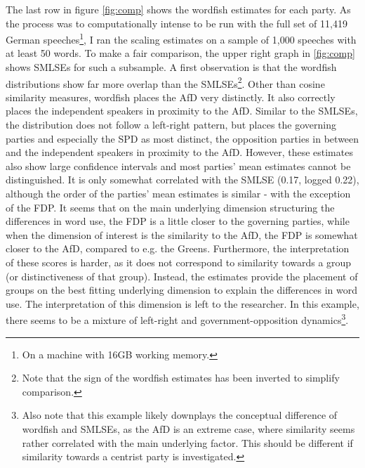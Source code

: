 \documentclass{article}
\begin{document}
The last row in figure \ref{fig:comp} shows the wordfish estimates for each party. As the process was to computationally intense to be run with the full set of 11,419 German speeches\footnote{On a machine with 16GB working memory.}, I ran the scaling estimates on a sample of 1,000 speeches with at least 50 words. To make a fair comparison, the upper right graph in \ref{fig:comp} shows SMLSEs for such a subsample. A first observation is that the wordfish distributions show far more overlap than the SMLSEs\footnote{Note that the sign of the wordfish estimates has been inverted to simplify comparison.}. Other than cosine similarity measures, wordfish places the AfD very distinctly. It also correctly places the independent speakers in proximity to the AfD. Similar to the SMLSEs, the distribution does not follow a left-right pattern, but places the governing parties and especially the SPD as most distinct, the opposition parties in between and the independent speakers in proximity to the AfD. However, these estimates also show large confidence intervals and most parties' mean estimates cannot be distinguished. It is only somewhat correlated with the SMLSE (0.17, logged 0.22), although the order of the parties' mean estimates is similar - with the exception of the FDP. It seems that on the main underlying dimension structuring the differences in word use, the FDP is a little closer to the governing parties, while when the dimension of interest is the similarity to the AfD, the FDP is somewhat closer to the AfD, compared to e.g. the Greens. Furthermore, the interpretation of these scores is harder, as it does not correspond to similarity towards a group (or distinctiveness of that group). Instead, the estimates provide the placement of groups on the best fitting underlying dimension to explain the differences in word use. The interpretation of this dimension is left to the researcher. In this example, there seems to be a mixture of left-right and government-opposition dynamics\footnote{Also note that this example likely downplays the conceptual difference of wordfish and SMLSEs, as the AfD is an extreme case, where similarity seems rather correlated with the main underlying factor. This should be different if similarity towards a centrist party is investigated.}.\par
\end{document}
